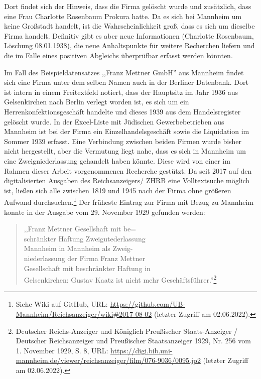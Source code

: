 Dort findet sich der Hinweis, dass die Firma gelöscht wurde und zusätzlich, dass eine Frau Charlotte Rosenbaum Prokura hatte. Da es sich bei Mannheim um keine Großstadt handelt, ist die Wahrscheinlichkeit groß, dass es sich um dieselbe Firma handelt. Definitiv gibt es aber neue Informationen (Charlotte Rosenbaum, Löschung 08.01.1938), die neue Anhaltspunkte für weitere Recherchen liefern und die im Falle eines positiven Abgleichs überprüfbar erfasst werden könnten. 

Im Fall des Beispieldatensatzes ,,Franz Mettner GmbH'' aus Mannheim findet sich eine Firma unter dem selben Namen auch in der Berliner Datenbank. Dort ist intern in einem Freitextfeld notiert, dass der Hauptsitz im Jahr 1936 aus Gelsenkirchen nach Berlin verlegt worden ist, es sich um ein Herrenkonfektionsgeschäft handelte und dieses 1939 aus dem Handelsregister gelöscht wurde. In der Excel-Liste mit Jüdischen Gewerbebetrieben aus Mannheim ist bei der Firma ein Einzelhandelsgeschäft sowie die Liquidation im Sommer 1939 erfasst. Eine Verbindung zwischen beiden Firmen wurde bisher nicht hergestellt, aber die Vermutung liegt nahe, dass es sich in Mannheim um eine Zweigniederlassung gehandelt haben könnte. Diese wird von einer im Rahmen dieser Arbeit vorgenommenen Recherche gestützt. Da seit 2017 auf den digitalisierten Ausgaben des Reichsanzeigers/ ZHRB eine Volltextsuche möglich ist, ließen sich alle zwischen 1819 und 1945 nach der Firma ohne größeren Aufwand durchsuchen.\footnote{Siehe Wiki auf GitHub, URL: \url{https://github.com/UB-Mannheim/Reichsanzeiger/wiki\#2017-08-02} (letzter Zugriff am 02.06.2022).} Der früheste Eintrag zur Firma mit Bezug zu Mannheim konnte in der Ausgabe vom 29. November 1929 gefunden werden: 

\begin{quote}
    ,,Franz Mettner Gesellshaft mit be= \\
    schränkter Haftung Zweigutederlassung \\
    Mannheim in Mannheim als Zweig- \\
    niederlassung der Firma Franz Mettner \\
    Gesellschaft mit beschränkter Haftung in \\
    Gelsenkirchen: Gustav Kaatz ist nicht mehr Geschäftsführer.''\footnote{Deutscher Reichs-Anzeiger und Königlich Preußischer Staats-Anzeiger / Deutscher Reichsanzeiger und Preußischer Staatsanzeiger 1929, Nr. 256 vom 1. November 1929, S. 8, URL: \url{https://digi.bib.uni-mannheim.de/viewer/reichsanzeiger/film/076-9036/0095.jp2} (letzter Zugriff am 02.06.2022).}
\end{quote}

